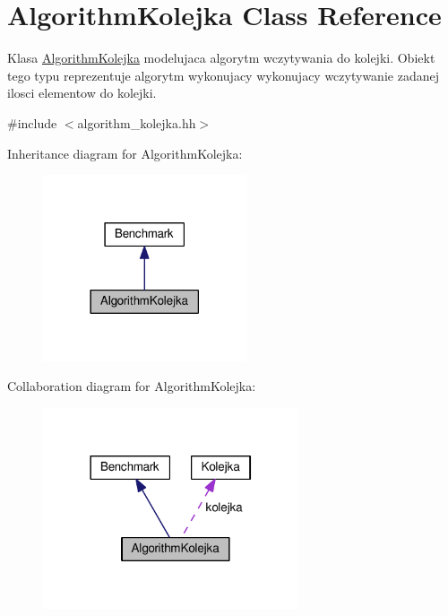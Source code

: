 \hypertarget{class_algorithm_kolejka}{}\section{Algorithm\+Kolejka Class Reference}
\label{class_algorithm_kolejka}


Klasa \hyperlink{class_algorithm_kolejka}{Algorithm\+Kolejka} modelujaca algorytm wczytywania do kolejki. Obiekt tego typu reprezentuje algorytm wykonujacy wykonujacy wczytywanie zadanej ilosci elementow do kolejki.  




{\ttfamily \#include $<$algorithm\+\_\+kolejka.\+hh$>$}



Inheritance diagram for Algorithm\+Kolejka\+:\nopagebreak
\begin{figure}[H]
\begin{center}
\leavevmode
\includegraphics[width=170pt]{class_algorithm_kolejka__inherit__graph}
\end{center}
\end{figure}


Collaboration diagram for Algorithm\+Kolejka\+:\nopagebreak
\begin{figure}[H]
\begin{center}
\leavevmode
\includegraphics[width=213pt]{class_algorithm_kolejka__coll__graph}
\end{center}
\end{figure}
